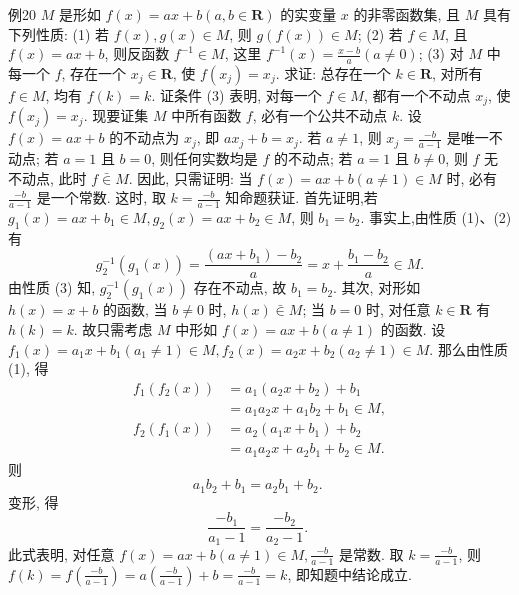 例20 $M$ 是形如 $f(x)=a x+b(a, b \in \mathbf{R})$ 的实变量 $x$ 的非零函数集, 且 $M$ 具有下列性质:
(1) 若 $f(x), g(x) \in M$, 则 $g(f(x)) \in M$;
(2) 若 $f \in M$, 且 $f(x)=a x+b$, 则反函数 $f^{-1} \in M$, 这里 $f^{-1}(x)=\frac{x-b}{a} (a \neq 0)$;
(3) 对 $M$ 中每一个 $f$, 存在一个 $x_j \in \mathbf{R}$, 使 $f\left(x_j\right)=x_j$.
求证: 总存在一个 $k \in \mathbf{R}$, 对所有 $f \in M$, 均有 $f(k)=k$.
证条件 (3) 表明, 对每一个 $f \in M$, 都有一个不动点 $x_j$, 使 $f\left(x_j\right)=x_j$. 现要证集 $M$ 中所有函数 $f$, 必有一个公共不动点 $k$.
设 $f(x)=a x+b$ 的不动点为 $x_j$, 即 $a x_j+b=x_j$.
若 $a \neq 1$, 则 $x_j=\frac{-b}{a-1}$ 是唯一不动点;
若 $a=1$ 且 $b=0$, 则任何实数均是 $f$ 的不动点;
若 $a=1$ 且 $b \neq 0$, 则 $f$ 无不动点, 此时 $f \bar{\in} M$.
因此, 只需证明: 当 $f(x)=a x+b(a \neq 1) \in M$ 时, 必有 $\frac{-b}{a-1}$ 是一个常数.
这时, 取 $k=\frac{-b}{a-1}$ 知命题获证.
首先证明,若 $g_1(x)=a x+b_1 \in M, g_2(x)=a x+b_2 \in M$, 则 $b_1=b_2$. 事实上,由性质 (1)、(2)有
$$
g_2^{-1}\left(g_1(x)\right)=\frac{\left(a x+b_1\right)-b_2}{a}=x+\frac{b_1-b_2}{a} \in M .
$$
由性质 (3) 知, $g_2^{-1}\left(g_1(x)\right)$ 存在不动点, 故 $b_1=b_2$.
其次, 对形如 $h(x)=x+b$ 的函数, 当 $b \neq 0$ 时, $h(x) \bar{\in} M$; 当 $b=0$ 时, 对任意 $k \in \mathbf{R}$ 有 $h(k)=k$. 故只需考虑 $M$ 中形如 $f(x)=a x+b(a \neq 1)$ 的函数.
设 $f_1(x)=a_1 x+b_1\left(a_1 \neq 1\right) \in M, f_2(x)=a_2 x+b_2\left(a_2 \neq 1\right) \in M$. 那么由性质 (1), 得
$$
\begin{aligned}
f_1\left(f_2(x)\right) & =a_1\left(a_2 x+b_2\right)+b_1 \\
& =a_1 a_2 x+a_1 b_2+b_1 \in M, \\
f_2\left(f_1(x)\right) & =a_2\left(a_1 x+b_1\right)+b_2 \\
& =a_1 a_2 x+a_2 b_1+b_2 \in M .
\end{aligned}
$$
则
$$
a_1 b_2+b_1=a_2 b_1+b_2 \text {. }
$$
变形, 得
$$
\frac{-b_1}{a_1-1}=\frac{-b_2}{a_2-1} \text {. }
$$
此式表明, 对任意 $f(x)=a x+b(a \neq 1) \in M, \frac{-b}{a-1}$ 是常数.
取 $k= \frac{-b}{a-1}$, 则 $f(k)=f\left(\frac{-b}{a-1}\right)=a\left(\frac{-b}{a-1}\right)+b=\frac{-b}{a-1}=k$, 即知题中结论成立.



